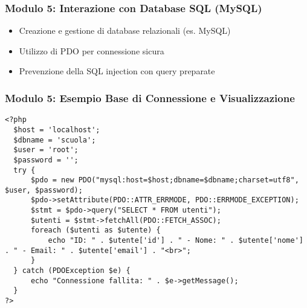 \documentclass{beamer}
\begin{document}

\begin{frame}
\frametitle{Modulo 5: Interazione con Database SQL (MySQL)}
\begin{itemize}
    \item Creazione e gestione di database relazionali (es. MySQL)
    \item Utilizzo di PDO per connessione sicura
    \item Prevenzione della SQL injection con query preparate
\end{itemize}
\end{frame}

\begin{frame}[fragile]
\frametitle{Modulo 5: Esempio Base di Connessione e Visualizzazione}
\begin{lstlisting}
<?php
  $host = 'localhost';
  $dbname = 'scuola';
  $user = 'root';
  $password = '';
  try {
      $pdo = new PDO("mysql:host=$host;dbname=$dbname;charset=utf8", $user, $password);
      $pdo->setAttribute(PDO::ATTR_ERRMODE, PDO::ERRMODE_EXCEPTION);
      $stmt = $pdo->query("SELECT * FROM utenti");
      $utenti = $stmt->fetchAll(PDO::FETCH_ASSOC);
      foreach ($utenti as $utente) {
          echo "ID: " . $utente['id'] . " - Nome: " . $utente['nome'] . " - Email: " . $utente['email'] . "<br>";
      }
  } catch (PDOException $e) {
      echo "Connessione fallita: " . $e->getMessage();
  }
?>
\end{lstlisting}
\end{frame}
\end{document}
